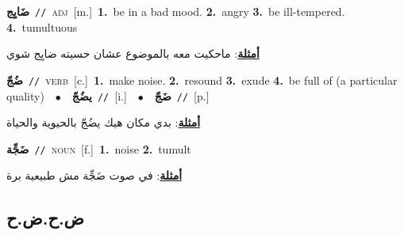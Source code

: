 \documentclass[10pt,a4paper,twoside]{article} %
\begin{document}
\begin{multicols}{2}
{{{{{\setlength\topsep{0pt}\textbf{\foreignlanguage{arabic}{ضَايِج}}\ {\color{gray}\texttt{//}\color{black}}\ \textsc{adj}\ [m.]\ \textbf{1.}~be in a bad mood.  \textbf{2.}~angry  \textbf{3.}~be ill-tempered.  \textbf{4.}~tumultuous\  \begin{flushright}\color{gray}\foreignlanguage{arabic}{\textbf{\underline{\foreignlanguage{arabic}{أمثلة}}}: ماحكيت معه بالموضوع عشان حسيته ضايِج شوي}\end{flushright}\color{black}} \vspace{2mm}

{\setlength\topsep{0pt}\textbf{\foreignlanguage{arabic}{ضُجّ}}\ {\color{gray}\texttt{//}\color{black}}\ \textsc{verb}\ [c.]\ \textbf{1.}~make noise.  \textbf{2.}~resound  \textbf{3.}~exude  \textbf{4.}~be full of (a particular quality)\ \ $\bullet$\ \ \setlength\topsep{0pt}\textbf{\foreignlanguage{arabic}{يضُجّ}}\ {\color{gray}\texttt{//}\color{black}}\ [i.]\ \ $\bullet$\ \ \setlength\topsep{0pt}\textbf{\foreignlanguage{arabic}{ضَجّ}}\ {\color{gray}\texttt{//}\color{black}}\ [p.]\  \begin{flushright}\color{gray}\foreignlanguage{arabic}{\textbf{\underline{\foreignlanguage{arabic}{أمثلة}}}: بدي مكان هيك يضُجّ بالحيوية والحياة}\end{flushright}\color{black}} \vspace{2mm}

{\setlength\topsep{0pt}\textbf{\foreignlanguage{arabic}{ضَجِّة}}\ {\color{gray}\texttt{//}\color{black}}\ \textsc{noun}\ [f.]\ \textbf{1.}~noise  \textbf{2.}~tumult\  \begin{flushright}\color{gray}\foreignlanguage{arabic}{\textbf{\underline{\foreignlanguage{arabic}{أمثلة}}}: في صوت ضَجِّة مش طبيعية برة}\end{flushright}\color{black}} \vspace{2mm}

\vspace{-3mm}
\subsection*{\color{blue}\foreignlanguage{arabic}{ض.ح.ض.ح}\color{blue}{}} 

}}}}
\end{multicols}
\end{document}
